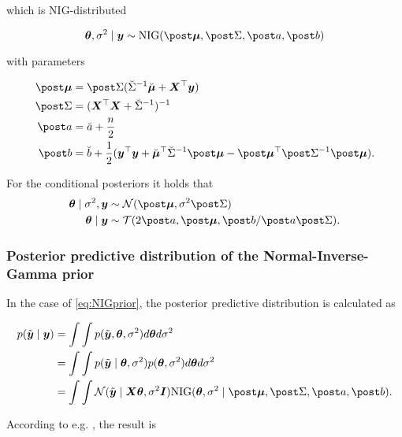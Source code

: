 which is NIG-distributed

\begin{equation*}
    \btheta, \ssd \mid \by \sim \text{NIG}(\mupo, \Sdpo, \apo, \bpo)
\end{equation*}

with parameters

\begin{equation*}
    \begin{aligned}
        \mupo &= \Sdpo (\Sdipri \mupri + \bX^\top \by) \\
        \Sdpo &= (\bX^\top \bX + \Sdipri)^{-1} \\
        \apo &= \apri + \frac{n}{2}\\
        \bpo &= \bpri + \frac{1}{2} ( \by^\top \by + \mupri^\top \Sdipri \mupo - \mupo^\top \Sdipo \mupo).
    \end{aligned}
\end{equation*}

For the conditional posteriors it holds that
\begin{equation*}
    \begin{aligned}
        \btheta \mid \ssd, \by &\sim \Ncal(\mupo, \ssd \Sdpo) \\
        \btheta \mid \by &\sim \Tcal(2 \apo, \mupo, \bpo / \apo \Sdpo).
    \end{aligned}
\end{equation*}

\subsubsection*{Posterior predictive distribution of the Normal-Inverse-Gamma prior}

In the case of \eqref{eq:NIGprior}, the posterior predictive distribution is calculated as 

\begin{equation*}
    \begin{aligned}
        p(\ty \mid \by) 
        &= \int \int p(\ty, \btheta, \ssd) d \btheta d \ssd \\
        &= \int \int p(\ty \mid \btheta, \ssd) p(\btheta, \ssd) d \btheta d \ssd \\
        &= \int \int \Ncal(\ty \mid \bX \btheta, \ssd \bI) \text{NIG}(\btheta, \ssd \mid \mupo, \Sdpo, \apo, \bpo).
    \end{aligned}
\end{equation*}

According to e.g. \citet{murphy_conjugate_nodate}, the result is


